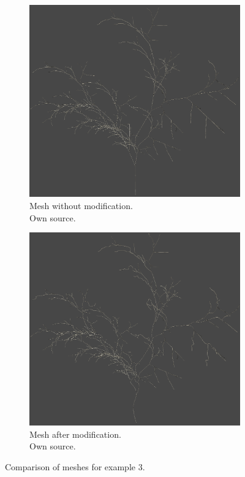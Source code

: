 \documentclass[b5paper,twoside,11pt]{article}
\begin{document}
\begin{figure}[!htp]
\centering
\begin{subfigure}{.9\textwidth}
  \centering
  \includegraphics[width=0.8\linewidth]{przyklad3MOD}
\caption{Mesh without modification.\\Own source. \label{przyklad3.siatka}}
\end{subfigure}
%
\begin{subfigure}{.9\textwidth}
  \centering
  \includegraphics[width=0.8\linewidth]{przyklad3}
\caption{Mesh after modification.\\Own source. \label{przyklad3.siatkaMOD}}
\end{subfigure}
\caption{Comparison of meshes for example  3.}
\label{przyklad3}
\end{figure}
\newpage
\end{document}
